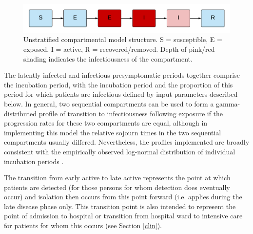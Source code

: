 \begin{figure}[h]
    \includegraphics[width=\textwidth]{../covid_19/covid_19_seeiir.pdf}
    \caption{Unstratified compartmental model structure. S = susceptible, E = exposed, I = active, R = recovered/removed. Depth of pink/red shading indicates the infectiousness of the compartment.}
    \label{fig:seeiir}
\end{figure}

The latently infected and infectious presymptomatic periods together comprise the incubation period, with the incubation period and the proportion of this period for which patients are infectious defined by input parameters described below. In general, two sequential compartments can be used to form a gamma-distributed profile of transition to infectiousness following exposure if the progression rates for these two compartments are equal, although in implementing this model the relative sojourn times in the two sequential compartments usually differed. Nevertheless, the profiles implemented are broadly consistent with the empirically observed log-normal distribution of individual incubation periods \cite{RN13}.

The transition from early active to late active represents the point at which patients are detected (for those persons for whom detection does eventually occur) and isolation then occurs from this point forward (i.e. applies during the late disease phase only. This transition point is also intended to represent the point of admission to hospital or transition from hospital ward to intensive care for patients for whom this occurs (see Section \ref{clin}).
